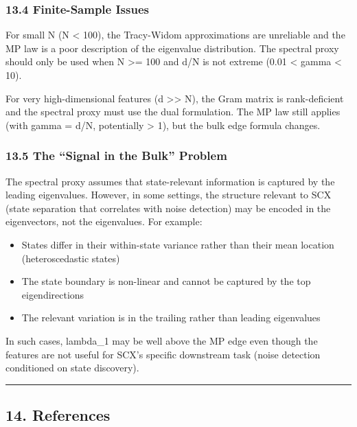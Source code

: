 \documentclass[
  12pt,
]{article}
\providecommand{\tightlist}{%
  \setlength{\itemsep}{0pt}\setlength{\parskip}{0pt}}
\begin{document}
\subsubsection{13.4 Finite-Sample Issues}\label{finite-sample-issues}

For small N (N \textless{} 100), the Tracy-Widom approximations are
unreliable and the MP law is a poor description of the eigenvalue
distribution. The spectral proxy should only be used when N
\textgreater= 100 and d/N is not extreme (0.01 \textless{} gamma
\textless{} 10).

For very high-dimensional features (d \textgreater\textgreater{} N), the
Gram matrix is rank-deficient and the spectral proxy must use the dual
formulation. The MP law still applies (with gamma = d/N, potentially
\textgreater{} 1), but the bulk edge formula changes.

\subsubsection{13.5 The ``Signal in the Bulk''
Problem}\label{the-signal-in-the-bulk-problem}

The spectral proxy assumes that state-relevant information is captured
by the leading eigenvalues. However, in some settings, the structure
relevant to SCX (state separation that correlates with noise detection)
may be encoded in the eigenvectors, not the eigenvalues. For example:

\begin{itemize}
\tightlist
\item
  States differ in their within-state variance rather than their mean
  location (heteroscedastic states)
\item
  The state boundary is non-linear and cannot be captured by the top
  eigendirections
\item
  The relevant variation is in the trailing rather than leading
  eigenvalues
\end{itemize}

In such cases, lambda\_1 may be well above the MP edge even though the
features are not useful for SCX's specific downstream task (noise
detection conditioned on state discovery).

\begin{center}\rule{0.5\linewidth}{0.5pt}\end{center}

\subsection{14. References}\label{references}
\end{document}
